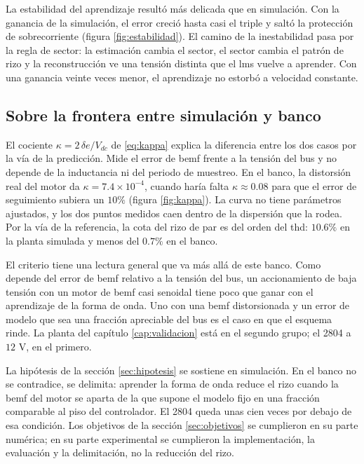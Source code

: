 \documentclass[../../../Tesis_JALS_Maestria.tex]{subfiles}
\begin{document}
La estabilidad del aprendizaje resultó más delicada que en simulación. Con la ganancia de la simulación, el error creció hasta casi el triple y saltó la protección de sobrecorriente (figura \ref{fig:estabilidad}). El camino de la inestabilidad pasa por la regla de sector: la estimación cambia el sector, el sector cambia el patrón de rizo y la reconstrucción ve una tensión distinta que el \acrshort{lms} vuelve a aprender. Con una ganancia veinte veces menor, el aprendizaje no estorbó a velocidad constante.

\subsection{Sobre la frontera entre simulación y banco}

El cociente $\kappa = 2\,\delta e/V_{dc}$ de \eqref{eq:kappa} explica la diferencia entre los dos casos por la vía de la predicción. Mide el error de \acrshort{bemf} frente a la tensión del bus y no depende de la inductancia ni del periodo de muestreo. En el banco, la distorsión real del motor da $\kappa = 7.4\times 10^{-4}$, cuando haría falta $\kappa \approx 0.08$ para que el error de seguimiento subiera un $10\%$ (figura \ref{fig:kappa}). La curva no tiene parámetros ajustados, y los dos puntos medidos caen dentro de la dispersión que la rodea. Por la vía de la referencia, la cota del rizo de par es del orden del \acrshort{thd}: $10.6\%$ en la planta simulada y menos del $0.7\%$ en el banco.

El criterio tiene una lectura general que va más allá de este banco. Como depende del error de \acrshort{bemf} relativo a la tensión del bus, un accionamiento de baja tensión con un motor de \acrshort{bemf} casi senoidal tiene poco que ganar con el aprendizaje de la forma de onda. Uno con una \acrshort{bemf} distorsionada y un error de modelo que sea una fracción apreciable del bus es el caso en que el esquema rinde. La planta del capítulo \ref{cap:validacion} está en el segundo grupo; el 2804 a $12$ V, en el primero.

La hipótesis de la sección \ref{sec:hipotesis} se sostiene en simulación. En el banco no se contradice, se delimita: aprender la forma de onda reduce el rizo cuando la \acrshort{bemf} del motor se aparta de la que supone el modelo fijo en una fracción comparable al piso del controlador. El 2804 queda unas cien veces por debajo de esa condición. Los objetivos de la sección \ref{sec:objetivos} se cumplieron en su parte numérica; en su parte experimental se cumplieron la implementación, la evaluación y la delimitación, no la reducción del rizo.
\end{document}

